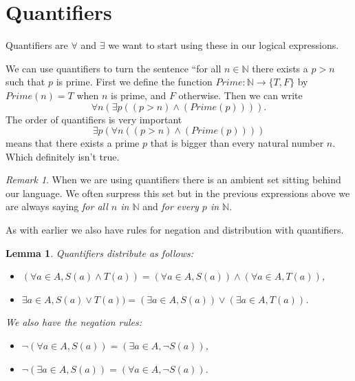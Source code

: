 \documentclass[
]{book}
\newtheorem{lemma}{Lemma}[chapter]
\theoremstyle{definition}
\theoremstyle{definition}
\theoremstyle{definition}
\theoremstyle{definition}
\theoremstyle{remark}
\newtheorem*{remark}{Remark}
\begin{document}
\section{Quantifiers}\label{quantifiers}

Quantifiers are \(\forall\) and \(\exists\) we want to start using these in our logical expressions.

We can use quantifiers to turn the sentence ``for all \(n \in \mathbb{N}\) there exists a \(p > n\) such that \(p\) is prime. First we define the function \(Prime: \mathbb{N} \rightarrow \{T, F\}\) by \(Prime(n) =T\) when \(n\) is prime, and \(F\) otherwise. Then we can write
\[\forall n (\exists p((p>n)\wedge(Prime(p)))).  \]
The order of quantifiers is very important
\[\exists p (\forall n ((p>n)\wedge (Prime(p))))  \] means that there exists a prime \(p\) that is bigger than every natural number \(n\). Which definitely isn't true.

\begin{remark}
When we are using quantifiers there is an ambient set sitting behind our language. We often surpress this set but in the previous expressions above we are always saying \emph{for all \(n\) in \(\mathbb{N}\)} and \emph{for every \(p\) in \(\mathbb{N}\)}.
\end{remark}

As with earlier we also have rules for negation and distribution with quantifiers.

\begin{lemma}

Quantifiers distribute as follows:

\begin{itemize}
\item
  \((\forall a \in A, S(a)\wedge T(a)) = (\forall a \in A, S(a))\wedge(\forall a \in A, T(a))\),
\item
  \(\exists a \in A, S(a)\vee T(a)) = (\exists a \in A, S(a))\vee (\exists a \in A, T(a))\).
\end{itemize}

We also have the negation rules:

\begin{itemize}
\item
  \(\neg(\forall a \in A, S(a))= (\exists a \in A, \neg S(a))\),
\item
  \(\neg(\exists a \in A, S(a)) = (\forall a \in A, \neg S(a))\).
\end{itemize}

\end{lemma}
\end{document}
